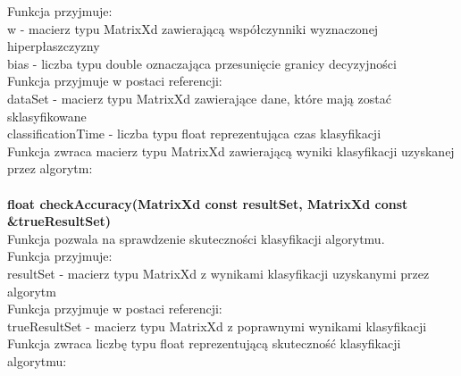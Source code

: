 \documentclass[[10pt,a4paper]{article}
\begin{document}
\vspace{3mm}Funkcja przyjmuje:\\
w - macierz typu MatrixXd zawierającą współczynniki wyznaczonej hiperpłaszczyzny\\
bias - liczba typu double oznaczająca przesunięcie granicy decyzyjności\\
\newline
\vspace{3mm}Funkcja przyjmuje w postaci referencji:\\
dataSet - macierz typu MatrixXd zawierające dane, które mają zostać sklasyfikowane\\
classificationTime - liczba typu float reprezentująca czas klasyfikacji\\
\newline
\vspace{3mm}Funkcja zwraca macierz typu MatrixXd zawierającą wyniki klasyfikacji uzyskanej przez algorytm:\\
\newline
\newline
\newline
{}\\
\newline
\textbf {float checkAccuracy(MatrixXd const resultSet, MatrixXd const \&trueResultSet)}\\
\newline
\vspace{3mm}Funkcja pozwala na sprawdzenie skuteczności klasyfikacji algorytmu.\\
\vspace{3mm}Funkcja przyjmuje:\\
resultSet - macierz typu MatrixXd z wynikami klasyfikacji uzyskanymi przez algorytm \\
\newline
\vspace{3mm}Funkcja przyjmuje w postaci referencji:\\
trueResultSet - macierz typu MatrixXd z poprawnymi wynikami klasyfikacji\\
\newline
\vspace{3mm}Funkcja zwraca liczbę typu float reprezentującą skuteczność klasyfikacji algorytmu:\\
\newline
\newline
\newline
{}\\
\end{document}
